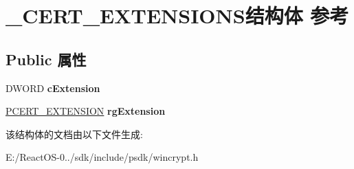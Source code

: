 \hypertarget{struct___c_e_r_t___e_x_t_e_n_s_i_o_n_s}{}\section{\+\_\+\+C\+E\+R\+T\+\_\+\+E\+X\+T\+E\+N\+S\+I\+O\+N\+S结构体 参考}
\label{struct___c_e_r_t___e_x_t_e_n_s_i_o_n_s}
\subsection*{Public 属性}
\begin{DoxyCompactItemize}
\item 
\mbox{\label{struct___c_e_r_t___e_x_t_e_n_s_i_o_n_s_a0cb933766734f0d2a801101d92d24116}} 
D\+W\+O\+RD {\bfseries c\+Extension}
\item 
\mbox{\label{struct___c_e_r_t___e_x_t_e_n_s_i_o_n_s_a27730a72da315d61f8866f7772c241d0}} 
\hyperlink{struct___c_e_r_t___e_x_t_e_n_s_i_o_n}{P\+C\+E\+R\+T\+\_\+\+E\+X\+T\+E\+N\+S\+I\+ON} {\bfseries rg\+Extension}
\end{DoxyCompactItemize}


该结构体的文档由以下文件生成\+:\begin{DoxyCompactItemize}
\item 
E\+:/\+React\+O\+S-\/0../sdk/include/psdk/wincrypt.\+h\end{DoxyCompactItemize}
